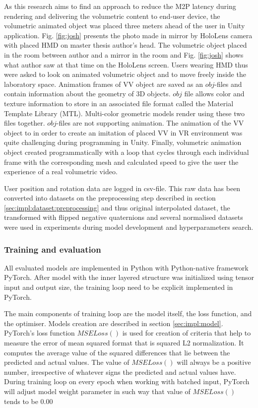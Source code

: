 As this research aims to find an approach to reduce the M2P latency during rendering and delivering the volumetric content to end-user device, the volumetric animated object was placed three meters ahead of the user in Unity application. Fig. \ref{fig:josh} presents the photo made in mirror by HoloLens camera with placed HMD on master thesis author's head. The volumetric object placed in the room between author and a mirror in the room and Fig. \ref{fig:josh} shows what author saw at that time on the HoloLens screen. Users wearing HMD thus were asked to look on animated volumetric object and to move freely inside the laboratory space. Animation frames of VV object are saved as an $obj$-files and contain information about the geometry of 3D objects. $obj$ file allows color and texture information to store in an associated file format called the Material Template Library (MTL). Multi-color geometric models render using these two files together. $obj$-files are not supporting animation. The animation of the VV object to in order to create an imitation of placed VV in VR environment was quite challenging during programming in Unity. Finally, volumetric animation object created programmatically with a loop that cycles through each individual frame with the corresponding mesh and calculated speed to give the user the experience of a real volumetric video.

User position and rotation data are logged in csv-file. This raw data has been converted into datasets on the preprocessing step described in section \ref{sec:impl:dataset:preprocessing} and thus original interpolated dataset, the transformed with flipped negative quaternions and several normalised datasets were used in experiments during model development and hyperparameters search.


\subsubsection{Training and evaluation}
\label{sec:impl:model:dev:programming}
All evaluated models are implemented in Python with Python-native framework PyTorch. After model with the inner layered structure was initialized using tensor input and output size, the training loop need to be explicit implemented in PyTorch. 

The main components of training loop are the model itself, the loss function, and the optimiser. Models creation are described in section \ref{sec:impl:model}. PyTorch's loss function $MSELoss()$ is used for creation of criteria that help to measure the error of mean squared format that is squared L2 normalization. It computes the average value of the squared differences that lie between the predicted and actual values. The value of $MSELoss()$ will always be a positive number, irrespective of whatever signs the predicted and actual values have. During training loop on every epoch when working with batched input, PyTorch will adjust model weight parameter in such way that value of $MSELoss()$ tends to be 0.00

